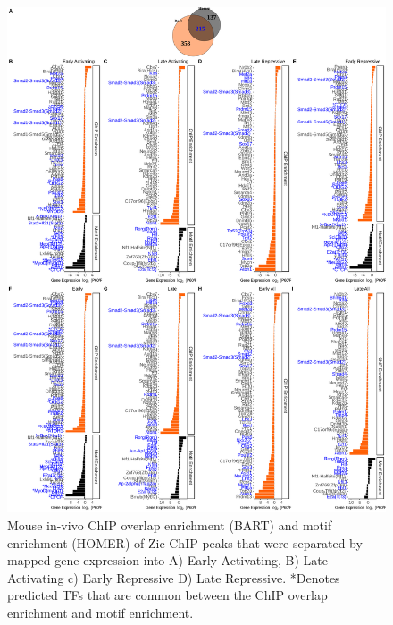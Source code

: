 \documentclass[fleqn,10pt,twocolumn]{wlscirep}
\begin{document}
\begin{figure}[ht]
\centering
\includegraphics[width=.95\textwidth]{../figures/supp_figure4.png}
\caption{Mouse in-vivo ChIP overlap enrichment (BART) and motif enrichment (HOMER) of Zic ChIP peaks that were separated by mapped gene expression into A) Early Activating, B) Late Activating c) Early Repressive D) Late Repressive. *Denotes predicted TFs that are common between the ChIP overlap enrichment and motif enrichment. }
\label{fig:HomerBart}
\end{figure}
\end{document}
